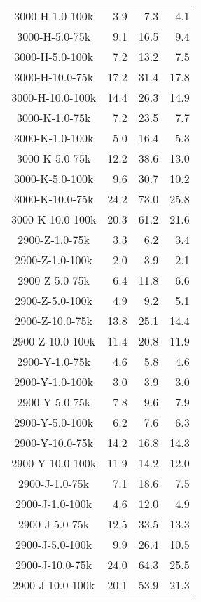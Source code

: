 \begin{longtable}{crrr}
    3000-H-1.0-100k  &    3.9 &    7.3 &    4.1 \\
    3000-H-5.0-75k   &    9.1 &   16.5 &    9.4 \\
    3000-H-5.0-100k  &    7.2 &   13.2 &    7.5 \\
    3000-H-10.0-75k  &   17.2 &   31.4 &   17.8 \\
    3000-H-10.0-100k &   14.4 &   26.3 &   14.9 \\
    3000-K-1.0-75k   &    7.2 &   23.5 &    7.7 \\
    3000-K-1.0-100k  &    5.0 &   16.4 &    5.3 \\
    3000-K-5.0-75k   &   12.2 &   38.6 &   13.0 \\
    3000-K-5.0-100k  &    9.6 &   30.7 &   10.2 \\
    3000-K-10.0-75k  &   24.2 &   73.0 &   25.8 \\
    3000-K-10.0-100k &   20.3 &   61.2 &   21.6 \\
    2900-Z-1.0-75k   &    3.3 &    6.2 &    3.4 \\
    2900-Z-1.0-100k  &    2.0 &    3.9 &    2.1 \\
    2900-Z-5.0-75k   &    6.4 &   11.8 &    6.6 \\
    2900-Z-5.0-100k  &    4.9 &    9.2 &    5.1 \\
    2900-Z-10.0-75k  &   13.8 &   25.1 &   14.4 \\
    2900-Z-10.0-100k &   11.4 &   20.8 &   11.9 \\
    2900-Y-1.0-75k   &    4.6 &    5.8 &    4.6 \\
    2900-Y-1.0-100k  &    3.0 &    3.9 &    3.0 \\
    2900-Y-5.0-75k   &    7.8 &    9.6 &    7.9 \\
    2900-Y-5.0-100k  &    6.2 &    7.6 &    6.3 \\
    2900-Y-10.0-75k  &   14.2 &   16.8 &   14.3 \\
    2900-Y-10.0-100k &   11.9 &   14.2 &   12.0 \\
    2900-J-1.0-75k   &    7.1 &   18.6 &    7.5 \\
    2900-J-1.0-100k  &    4.6 &   12.0 &    4.9 \\
    2900-J-5.0-75k   &   12.5 &   33.5 &   13.3 \\
    2900-J-5.0-100k  &    9.9 &   26.4 &   10.5 \\
    2900-J-10.0-75k  &   24.0 &   64.3 &   25.5 \\
    2900-J-10.0-100k &   20.1 &   53.9 &   21.3 \\

\end{longtable}
